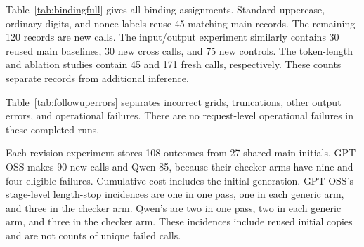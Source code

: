 \documentclass[11pt]{article}
\begin{document}
\begin{table}[t]
\centering\footnotesize

\caption{All 19 ablations and difficulty counts. Fully explicit rules, alphabet-only mapping, spaced output, and the period empty marker generate identical default prompts but independent outcome records.}
\label{tab:ablation}
\end{table}

Table~\ref{tab:bindingfull} gives all binding assignments. Standard uppercase, ordinary digits, and nonce labels reuse 45 matching main records. The remaining 120 records are new calls. The input/output experiment similarly contains 30 reused main baselines, 30 new cross calls, and 75 new controls. The token-length and ablation studies contain 45 and 171 fresh calls, respectively. These counts separate records from additional inference.

\begin{table}[t]
\centering\footnotesize

\caption{All binding conditions for both models. Permutations are seeded and fixed per condition. Each tier contains five puzzles.}
\label{tab:bindingfull}
\end{table}

\begin{table}[t]
\centering\footnotesize

\caption{Revision outcomes by alphabet, arm, and tier. Each alphabet has three puzzles per tier. Branches reuse the same initial answer within each model.}
\label{tab:revisionfull}
\end{table}

\begin{table}[t]
\centering\small

\caption{Exclusive final-outcome categories for every follow-up. Input/output totals include 75 simple controls. Revision rows count final branch outcomes, not unique initial solves or stage-level failures.}
\label{tab:followuperrors}
\end{table}

Table~\ref{tab:followuperrors} separates incorrect grids, truncations, other output errors, and operational failures. There are no request-level operational failures in these completed runs.

Each revision experiment stores 108 outcomes from 27 shared main initials. GPT-OSS makes 90 new calls and Qwen 85, because their checker arms have nine and four eligible failures. Cumulative cost includes the initial generation. GPT-OSS's stage-level length-stop incidences are one in one pass, one in each generic arm, and three in the checker arm. Qwen's are two in one pass, two in each generic arm, and three in the checker arm. These incidences include reused initial copies and are not counts of unique failed calls.
\end{document}
